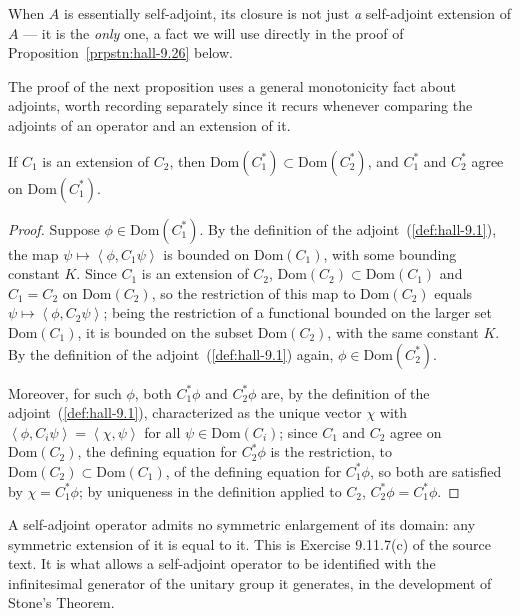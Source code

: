 When $A$ is essentially self-adjoint, its closure is not just \textit{a} self-adjoint extension of $A$ — it is the \textit{only} one, a fact we will use directly in the proof of Proposition~\ref{prpstn:hall-9.26} below.

The proof of the next proposition uses a general monotonicity fact about adjoints, worth recording separately since it recurs whenever comparing the adjoints of an operator and an extension of it.

\begin{lemma}
    \label{lmm:extension-reverses-adjoint-domains}
    \leanok
    If $C_1$ is an extension of $C_2$, then $\text{Dom}(C_1^*) \subset \text{Dom}(C_2^*)$, and $C_1^*$ and $C_2^*$ agree on $\text{Dom}(C_1^*)$.
\end{lemma}
\begin{proof}
    \leanok
Suppose $\phi \in \text{Dom}(C_1^*)$. By the definition of the adjoint~(\ref{def:hall-9.1}), the map $\psi \mapsto \left< \phi, C_1\psi \right>$ is bounded on $\text{Dom}(C_1)$, with some bounding constant $K$. Since $C_1$ is an extension of $C_2$, $\text{Dom}(C_2) \subset \text{Dom}(C_1)$ and $C_1 = C_2$ on $\text{Dom}(C_2)$, so the restriction of this map to $\text{Dom}(C_2)$ equals $\psi \mapsto \left< \phi, C_2\psi \right>$; being the restriction of a functional bounded on the larger set $\text{Dom}(C_1)$, it is bounded on the subset $\text{Dom}(C_2)$, with the same constant $K$. By the definition of the adjoint~(\ref{def:hall-9.1}) again, $\phi \in \text{Dom}(C_2^*)$.

Moreover, for such $\phi$, both $C_1^*\phi$ and $C_2^*\phi$ are, by the definition of the adjoint~(\ref{def:hall-9.1}), characterized as the unique vector $\chi$ with $\left< \phi, C_i\psi \right> = \left< \chi, \psi \right>$ for all $\psi \in \text{Dom}(C_i)$; since $C_1$ and $C_2$ agree on $\text{Dom}(C_2)$, the defining equation for $C_2^*\phi$ is the restriction, to $\text{Dom}(C_2) \subset \text{Dom}(C_1)$, of the defining equation for $C_1^*\phi$, so both are satisfied by $\chi = C_1^*\phi$; by uniqueness in the definition applied to $C_2$, $C_2^*\phi = C_1^*\phi$.
\end{proof}

A self-adjoint operator admits no symmetric enlargement of its domain: any symmetric extension of it is equal to it. This is Exercise 9.11.7(c) of the source text. It is what allows a self-adjoint operator to be identified with the infinitesimal generator of the unitary group it generates, in the development of Stone's Theorem.

